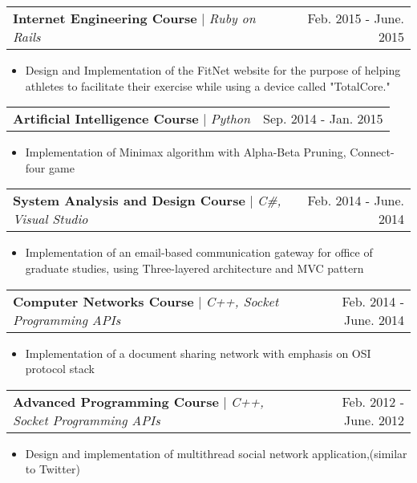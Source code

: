 \documentclass[letterpaper,11pt]{article}
\makeatletter
\newcommand{\resumeItem}[1]{
  \item\small{
    {#1 \vspace{-2pt}}
  }
}
\newcommand{\resumeProjectHeading}[2]{
    \item
    \begin{tabular*}{0.97\textwidth}{l@{\extracolsep{\fill}}r}
      \small#1 & #2 \\
    \end{tabular*}\vspace{-7pt}
}
\newcommand{\resumeItemListStart}{\begin{itemize}}
\newcommand{\resumeItemListEnd}{\end{itemize}\vspace{-5pt}}
\makeatother
\begin{document}
     \resumeProjectHeading
          {\textbf{Internet Engineering Course} $|$ \emph{Ruby on Rails}}{Feb. 2015 - June. 2015}
          \resumeItemListStart
            \resumeItem{Design and Implementation of the FitNet website for the purpose of helping athletes to facilitate their exercise while using a device called "TotalCore."}
          \resumeItemListEnd 

     \resumeProjectHeading
          {\textbf{Artificial Intelligence Course} $|$ \emph{Python}}{Sep. 2014 - Jan. 2015}
          \resumeItemListStart
            \resumeItem{Implementation of Minimax algorithm with Alpha-Beta Pruning, Connect-four game}
          \resumeItemListEnd

    \resumeProjectHeading
          {\textbf{System Analysis and Design Course} $|$ \emph{C\#, Visual Studio}}{Feb. 2014 - June. 2014}
          \resumeItemListStart
            \resumeItem{Implementation of an email-based communication gateway for office of graduate studies, using Three-layered architecture and MVC pattern}
          \resumeItemListEnd 
          
    \resumeProjectHeading
          {\textbf{Computer Networks Course} $|$ \emph{C++, Socket Programming APIs}}{Feb. 2014 - June. 2014}
          \resumeItemListStart
            \resumeItem{Implementation of a document sharing network with emphasis on OSI protocol stack}
          \resumeItemListEnd           
          
          
    \resumeProjectHeading
          {\textbf{Advanced Programming Course} $|$ \emph{C++, Socket Programming APIs}}{Feb. 2012 - June. 2012}
          \resumeItemListStart
            \resumeItem{Design and implementation of multithread social network application,(similar to Twitter)}
          \resumeItemListEnd 
          
\end{document}
